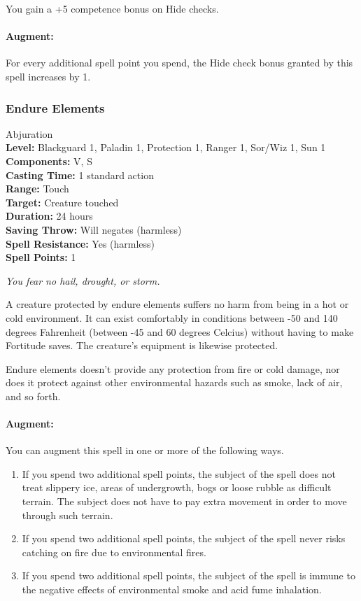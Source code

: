 You gain a +5 competence bonus on Hide checks.

\paragraph{Augment:} For every additional spell point you spend, the Hide check bonus granted by this spell increases by 1.
\subsubsection{Endure Elements}
\label{Spell:EndureElements}
Abjuration
\\ \textbf{Level:} Blackguard 1, Paladin 1, Protection 1, Ranger 1, Sor/Wiz 1, Sun 1
\\ \textbf{Components:} V, S
\\ \textbf{Casting Time:} 1 standard action
\\ \textbf{Range:} Touch
\\ \textbf{Target:} Creature touched
\\ \textbf{Duration:} 24 hours
\\ \textbf{Saving Throw:} Will negates (harmless)
\\ \textbf{Spell Resistance:} Yes (harmless)
\\ \textbf{Spell Points:} 1

\emph{You fear no hail, drought, or storm.}

A creature protected by endure elements suffers no harm from being in a hot or cold environment. 
It can exist comfortably in conditions between -50 and 140 degrees Fahrenheit (between -45 and 60 degrees Celcius) without having to make Fortitude saves. 
The creature's equipment is likewise protected.

Endure elements doesn't provide any protection from fire or cold damage, 
nor does it protect against other environmental hazards such as smoke, lack of air, and so forth.

\paragraph{Augment:} You can augment this spell in one or more of the following ways.
\begin{enumerate}
\item If you spend two additional spell points, the subject of the spell does not treat slippery ice, areas of undergrowth, bogs or loose rubble as difficult terrain.
The subject does not have to pay extra movement in order to move through such terrain.
\item If you spend two additional spell points, the subject of the spell never risks catching on fire due to environmental fires.
\item If you spend two additional spell points, the subject of the spell is immune to the negative effects of environmental smoke and acid fume inhalation.
\end{enumerate}


